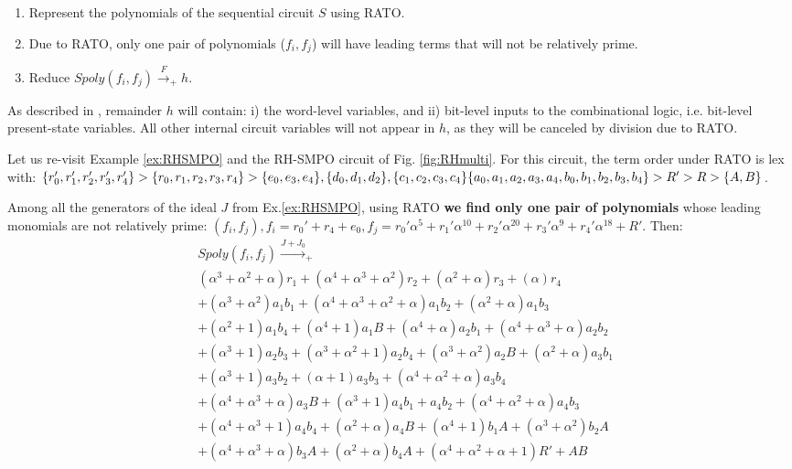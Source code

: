 \begin{enumerate}
\item Represent the polynomials of the sequential circuit $S$ using RATO.
\item Due to RATO, only one pair of polynomials ($f_i, f_j$) will have
  leading terms that will not be relatively prime.
\item Reduce $Spoly(f_i, f_j) \xrightarrow{F}_+ h$.
\end{enumerate}
As described in \cite{pruss:dac14}, remainder $h$ will contain:
  i) the word-level variables, and ii) bit-level inputs to the
  combinational logic, i.e. bit-level present-state variables. All
  other internal circuit variables will not appear in $h$, as they
  will be canceled by division due to RATO. 

\begin{Example}
\label{ex:newRATO}
Let us re-visit Example \ref{ex:RHSMPO} and the RH-SMPO circuit of
Fig. \ref{fig:RHmulti}. For this circuit, the term order under
RATO is lex with: $\{r_0',r_1',r_2',r_3',r_4'\} > \{r_0, r_1, r_2,r_3,r_4\}
> \{e_0,e_3,e_4\}, \{d_0,d_1,d_2\}, \{c_1,c_2,c_3,c_4\} 
\{ a_0, a_1, a_2, a_3, a_4, \\
b_0, b_1, b_2,  b_3, b_4 \} > R'>R>\{A,B\}$. 


Among all the generators of the ideal $J$ from Ex.\ref{ex:RHSMPO},
using RATO \textbf{we find only one pair of polynomials} whose leading  
monomials are not relatively prime:
$(f_i, f_j), f_i = r_0'+r_4+e_0, f_j
=r_0'\alpha^5+r_1'\alpha^{10}+r_2'\alpha^{20}+r_3'\alpha^9+r_4'\alpha^{18}
+ R'$. Then: %
\vspace{-0.1in}
{\small
\begin{align}
&Spoly(f_i,f_j) \xrightarrow{J+J_0}_{+}\nonumber\\
&(\alpha^3+\alpha^2+\alpha) r_1+(\alpha^4+\alpha^3+\alpha^2) r_2+(\alpha^2+\alpha) r_3+(\alpha) r_4\nonumber\\
&+(\alpha^3+\alpha^2) a_1 b_1+(\alpha^4+\alpha^3+\alpha^2+\alpha) a_1 b_2+(\alpha^2+\alpha) a_1 b_3\nonumber\\
&+(\alpha^2+1) a_1 b_4+(\alpha^4+1) a_1 B+(\alpha^4+\alpha) a_2 b_1+(\alpha^4+\alpha^3+\alpha) a_2 b_2\nonumber\\
&+(\alpha^3+1) a_2 b_3+(\alpha^3+\alpha^2+1) a_2 b_4+(\alpha^3+\alpha^2) a_2 B+(\alpha^2+\alpha) a_3 b_1\nonumber\\
&+(\alpha^3+1) a_3 b_2+(\alpha+1) a_3 b_3+(\alpha^4+\alpha^2+\alpha) a_3 b_4\nonumber\\
&+(\alpha^4+\alpha^3+\alpha) a_3 B+(\alpha^3+1) a_4 b_1+a_4 b_2+(\alpha^4+\alpha^2+\alpha) a_4 b_3\nonumber\\
&+(\alpha^4+\alpha^3+1) a_4 b_4+(\alpha^2+\alpha) a_4 B+(\alpha^4+1) b_1 A+(\alpha^3+\alpha^2) b_2 A\nonumber\\
&+(\alpha^4+\alpha^3+\alpha) b_3 A+(\alpha^2+\alpha) b_4 A+(\alpha^4+\alpha^2+\alpha+1) R'+A B\nonumber
\end{align}
}
\end{Example}
